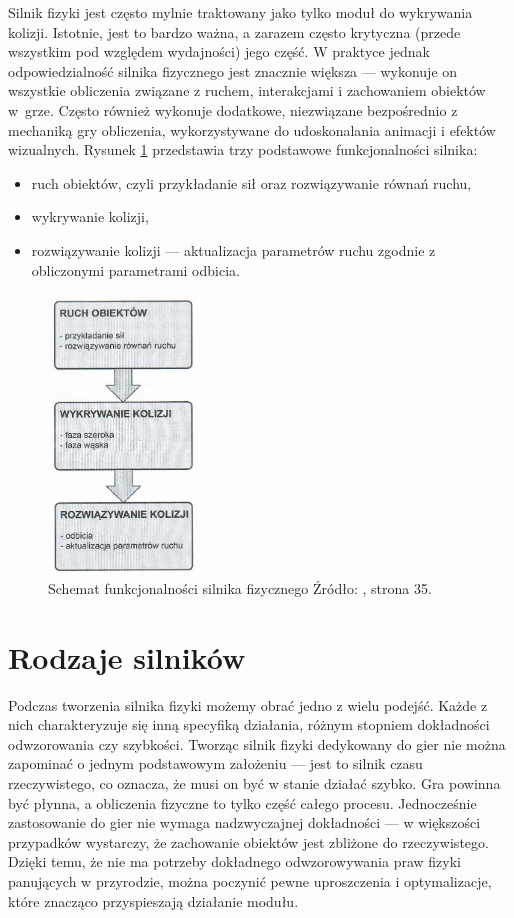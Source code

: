Silnik fizyki jest często mylnie traktowany jako tylko moduł do wykrywania kolizji. Istotnie, jest to bardzo ważna, a zarazem często krytyczna (przede wszystkim pod względem wydajności) jego część. W praktyce jednak odpowiedzialność silnika fizycznego jest znacznie większa --- wykonuje on wszystkie obliczenia związane z ruchem, interakcjami i zachowaniem obiektów w~grze. Często również wykonuje dodatkowe, niezwiązane bezpośrednio z mechaniką gry obliczenia, wykorzystywane do udoskonalania animacji i efektów wizualnych. Rysunek \ref{fig:schematsilnika} przedstawia trzy podstawowe funkcjonalności silnika:
\begin{itemize}
	\item ruch obiektów, czyli przykładanie sił oraz rozwiązywanie równań ruchu,
	\item wykrywanie kolizji,
	\item rozwiązywanie kolizji --- aktualizacja parametrów ruchu zgodnie z obliczonymi parametrami odbicia.
\end{itemize}

\begin{figure}[ht]
	\centering
	\includegraphics[width=4cm]{images/schemat-silnika.eps}
	\caption[Schemat funkcjonalności silnika fizycznego]{Schemat funkcjonalności silnika fizycznego \newline Źródło: \cite{bib:box2dgrzadka}, strona 35.}
	\label{fig:schematsilnika}
\end{figure}

\section{Rodzaje silników}
Podczas tworzenia silnika fizyki możemy obrać jedno z wielu podejść. Każde z nich charakteryzuje się inną specyfiką działania, różnym stopniem dokładności odwzorowania czy szybkości. Tworząc silnik fizyki dedykowany do gier nie można zapominać o jednym podstawowym założeniu ---  jest to silnik czasu rzeczywistego, co oznacza, że musi on być w stanie działać szybko. Gra powinna być płynna, a obliczenia fizyczne to tylko część całego procesu. Jednocześnie zastosowanie do gier nie wymaga nadzwyczajnej dokładności --- w większości przypadków wystarczy, że zachowanie obiektów jest zbliżone do rzeczywistego. Dzięki temu, że nie ma potrzeby dokładnego odwzorowywania praw fizyki panujących w przyrodzie, można poczynić pewne uproszczenia i optymalizacje, które znacząco przyspieszają działanie modułu. 

